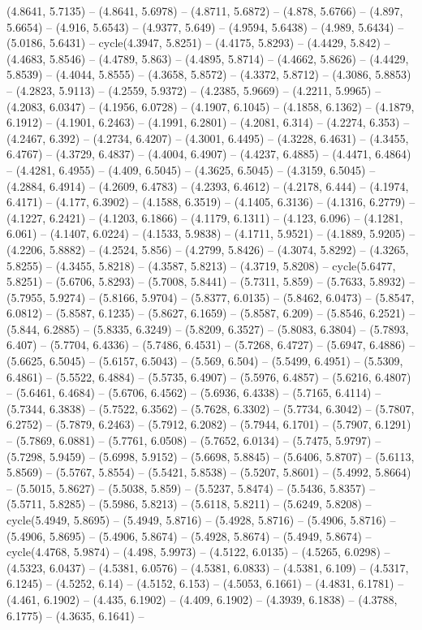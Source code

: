 (4.8641, 5.7135) -- (4.8641, 5.6978) -- (4.8711, 5.6872) -- (4.878, 5.6766) -- (4.897, 5.6654) -- (4.916, 5.6543) -- (4.9377, 5.649) -- (4.9594, 5.6438) -- (4.989, 5.6434) -- (5.0186, 5.6431) -- cycle(4.3947, 5.8251) -- (4.4175, 5.8293) -- (4.4429, 5.842) -- (4.4683, 5.8546) -- (4.4789, 5.863) -- (4.4895, 5.8714) -- (4.4662, 5.8626) -- (4.4429, 5.8539) -- (4.4044, 5.8555) -- (4.3658, 5.8572) -- (4.3372, 5.8712) -- (4.3086, 5.8853) -- (4.2823, 5.9113) -- (4.2559, 5.9372) -- (4.2385, 5.9669) -- (4.2211, 5.9965) -- (4.2083, 6.0347) -- (4.1956, 6.0728) -- (4.1907, 6.1045) -- (4.1858, 6.1362) -- (4.1879, 6.1912) -- (4.1901, 6.2463) -- (4.1991, 6.2801) -- (4.2081, 6.314) -- (4.2274, 6.353) -- (4.2467, 6.392) -- (4.2734, 6.4207) -- (4.3001, 6.4495) -- (4.3228, 6.4631) -- (4.3455, 6.4767) -- (4.3729, 6.4837) -- (4.4004, 6.4907) -- (4.4237, 6.4885) -- (4.4471, 6.4864) -- (4.4281, 6.4955) -- (4.409, 6.5045) -- (4.3625, 6.5045) -- (4.3159, 6.5045) -- (4.2884, 6.4914) -- (4.2609, 6.4783) -- (4.2393, 6.4612) -- (4.2178, 6.444) -- (4.1974, 6.4171) -- (4.177, 6.3902) -- (4.1588, 6.3519) -- (4.1405, 6.3136) -- (4.1316, 6.2779) -- (4.1227, 6.2421) -- (4.1203, 6.1866) -- (4.1179, 6.1311) -- (4.123, 6.096) -- (4.1281, 6.061) -- (4.1407, 6.0224) -- (4.1533, 5.9838) -- (4.1711, 5.9521) -- (4.1889, 5.9205) -- (4.2206, 5.8882) -- (4.2524, 5.856) -- (4.2799, 5.8426) -- (4.3074, 5.8292) -- (4.3265, 5.8255) -- (4.3455, 5.8218) -- (4.3587, 5.8213) -- (4.3719, 5.8208) -- cycle(5.6477, 5.8251) -- (5.6706, 5.8293) -- (5.7008, 5.8441) -- (5.7311, 5.859) -- (5.7633, 5.8932) -- (5.7955, 5.9274) -- (5.8166, 5.9704) -- (5.8377, 6.0135) -- (5.8462, 6.0473) -- (5.8547, 6.0812) -- (5.8587, 6.1235) -- (5.8627, 6.1659) -- (5.8587, 6.209) -- (5.8546, 6.2521) -- (5.844, 6.2885) -- (5.8335, 6.3249) -- (5.8209, 6.3527) -- (5.8083, 6.3804) -- (5.7893, 6.407) -- (5.7704, 6.4336) -- (5.7486, 6.4531) -- (5.7268, 6.4727) -- (5.6947, 6.4886) -- (5.6625, 6.5045) -- (5.6157, 6.5043) -- (5.569, 6.504) -- (5.5499, 6.4951) -- (5.5309, 6.4861) -- (5.5522, 6.4884) -- (5.5735, 6.4907) -- (5.5976, 6.4857) -- (5.6216, 6.4807) -- (5.6461, 6.4684) -- (5.6706, 6.4562) -- (5.6936, 6.4338) -- (5.7165, 6.4114) -- (5.7344, 6.3838) -- (5.7522, 6.3562) -- (5.7628, 6.3302) -- (5.7734, 6.3042) -- (5.7807, 6.2752) -- (5.7879, 6.2463) -- (5.7912, 6.2082) -- (5.7944, 6.1701) -- (5.7907, 6.1291) -- (5.7869, 6.0881) -- (5.7761, 6.0508) -- (5.7652, 6.0134) -- (5.7475, 5.9797) -- (5.7298, 5.9459) -- (5.6998, 5.9152) -- (5.6698, 5.8845) -- (5.6406, 5.8707) -- (5.6113, 5.8569) -- (5.5767, 5.8554) -- (5.5421, 5.8538) -- (5.5207, 5.8601) -- (5.4992, 5.8664) -- (5.5015, 5.8627) -- (5.5038, 5.859) -- (5.5237, 5.8474) -- (5.5436, 5.8357) -- (5.5711, 5.8285) -- (5.5986, 5.8213) -- (5.6118, 5.8211) -- (5.6249, 5.8208) -- cycle(5.4949, 5.8695) -- (5.4949, 5.8716) -- (5.4928, 5.8716) -- (5.4906, 5.8716) -- (5.4906, 5.8695) -- (5.4906, 5.8674) -- (5.4928, 5.8674) -- (5.4949, 5.8674) -- cycle(4.4768, 5.9874) -- (4.498, 5.9973) -- (4.5122, 6.0135) -- (4.5265, 6.0298) -- (4.5323, 6.0437) -- (4.5381, 6.0576) -- (4.5381, 6.0833) -- (4.5381, 6.109) -- (4.5317, 6.1245) -- (4.5252, 6.14) -- (4.5152, 6.153) -- (4.5053, 6.1661) -- (4.4831, 6.1781) -- (4.461, 6.1902) -- (4.435, 6.1902) -- (4.409, 6.1902) -- (4.3939, 6.1838) -- (4.3788, 6.1775) -- (4.3635, 6.1641) -- 